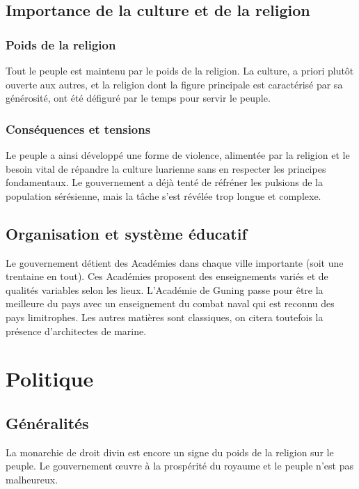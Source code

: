 \documentclass[french, a4paper, 12pt]{article}
\begin{document}
\subsection{Importance de la culture et de la religion}

\subsubsection{Poids de la religion}

Tout le peuple est maintenu par le poids de la religion. La culture, a priori plutôt ouverte aux autres, et la religion dont la figure principale est caractérisé par sa générosité, ont été défiguré par le temps pour servir le peuple.

\subsubsection{Conséquences et tensions}

Le peuple a ainsi développé une forme de violence, alimentée par la religion et le besoin vital de répandre la culture luarienne sans en respecter les principes fondamentaux. Le gouvernement a déjà tenté de réfréner les pulsions de la population sérésienne, mais la tâche s'est révélée trop longue et complexe.

\subsection{Organisation et système éducatif}

Le gouvernement détient des Académies dans chaque ville importante (soit une trentaine en tout). Ces Académies proposent des enseignements variés et de qualités variables selon les lieux. L'Académie de Guning passe pour être la meilleure du pays avec un enseignement du combat naval qui est reconnu des pays limitrophes. Les autres matières sont classiques, on citera toutefois la présence d'architectes de marine.

\section{Politique}

\subsection{Généralités}

La monarchie de droit divin est encore un signe du poids de la religion sur le peuple. Le gouvernement œuvre à la prospérité du royaume et le peuple n'est pas malheureux.
\end{document}
